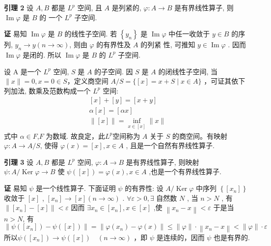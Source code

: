 \documentclass[12pt,a4paper,UTF8]{ctexart}
\begin{document}
\textbf{引理 2 }设 $ A, B $ 都是 $ L^{p} $ 空间, 且 $ A $ 是列紧的, $ \varphi: A \rightarrow B $ 是有界线性算子, 则  $\operatorname{Im} \varphi $ 是 $ B$  的 一个 $ L^{p} $ 子空间.

\textbf{证 }  易知 $ \operatorname{Im} \varphi $ 是 $ B $ 的线性子空间.
若 $ \left\{y_{n}\right\} $ 是 $ \operatorname{Im} \varphi $ 中任一收敛于 $ y \in B $ 的序列, $ y_{n} \rightarrow y(n \rightarrow \infty) $, 则由 $ \varphi $ 的有界性及 $ A $ 的列紧 性, 可推知 $ y \in \operatorname{Im} \varphi$ . 因而  $\operatorname{Im} \varphi$  是闭的. 所以 $ \operatorname{Im} \varphi $ 是 $ B $ 的 $ L^{p} $ 子空间.

设  A  是一个 $ L^{p} $ 空间,  $S$  是 $ A $ 的子空间. 因 $ S$  是 $ A $ 的闭线性子空间, 当 $ \|x\|=0, x=0 \in   S $，定义商空间  $A / S=\{[x]=x+S \mid x \in A\} $ ，可证其依下列加法, 数乘及范数构成一个 $ L^{p} $ 空间:
$$
\begin{array}{c}
{[x]+[y]=[x+y]} \\
\alpha[x]=[\alpha x] \\
\|[x]\|=\inf _{x \in[x]}\|x\|
\end{array}
$$
式中 $ \alpha \in F$,$ F$  为数域. 故良定，此$ L^{p}  $空间称为 $ A $ 关于 $ S $ 的商空间。有映射  $\varphi: A \rightarrow A / S $, 使得 $ \varphi(x)=[x], x \in A$ , 且是一个自然有界线性算子.

\textbf{引理 3 }设  $A, B$  都是  $ L^{p}  $ 空间,  $ \varphi: A \rightarrow B  $ 是有界线性算子, 则映射 $  \psi: A / \operatorname{Ker} \varphi \rightarrow B  $ 使 $  \psi([x])   =\varphi(x), x \in A $ ,也是一个有界线性算子.

\textbf{证 } 易知 $  \psi $  是一个线性算子. 下面证明  $ \psi $  的有界性: 设  $ A / \operatorname{Ker} \varphi  $ 中序列  $ \left\{\left[x_{n}\right]\right\} $  收敛于 $  [x] $ , $  \left[x_{n}\right] \rightarrow[x](n \rightarrow \infty)$  . $ \forall \varepsilon>0, \exists $  自然数 $  N $ , 当  $ n>N$  , 有
$ \left\|\left[x_{n}\right]-[x]\right\|<\varepsilon$ 
因而  $ \exists x_{n} \in\left[x_{n}\right], x \in[x] $ ,使
$ \left\|x_{n}-x\right\|<\varepsilon$ 
于是当 $ n>N $, 有
$$
\left\|\psi\left(\left[x_{n}\right]\right)-\psi([x])\right\|=\left\|\varphi\left(x_{n}\right)-\varphi\left(x\right)\right\| \leq \|\varphi\| \cdot\left\|x_{n}-x\right\|<\|\varphi\| \cdot \varepsilon 
$$
所以$\psi\left(\left[x_{n}\right]\right) \rightarrow \psi([x]) \quad(n \rightarrow \infty) $
，即 $ \psi$ 是连续的，因而  $\psi $ 也是有界的.

~\par
\end{document}
